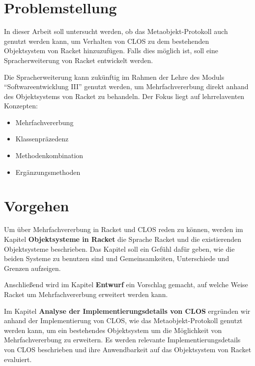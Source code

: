 \section{Problemstellung} 
In dieser Arbeit soll untersucht werden, ob das Metaobjekt-Protokoll auch genutzt werden kann, um Verhalten von CLOS zu dem bestehenden Objektsystem von Racket hinzuzufügen. Falls dies möglich ist, soll eine Spracherweiterung von Racket entwickelt werden. 

Die Spracherweiterung kann zukünftig im Rahmen der Lehre des Moduls ``Softwareentwicklung III'' genutzt werden, um Mehrfachvererbung direkt anhand des Objektsystems von Racket zu behandeln. Der Fokus liegt auf lehrrelaventen Konzepten: 
\begin{itemize}
 \item Mehrfachvererbung
 \item Klassenpräzedenz
 \item Methodenkombination
 \item Ergänzungsmethoden
\end{itemize}

% 


\section{Vorgehen}
Um über Mehrfachvererbung in Racket und CLOS reden zu können, werden im Kapitel \textbf{Objektsysteme in Racket} die Sprache Racket und die existierenden Objektsysteme beschrieben. Das Kapitel soll ein Gefühl dafür geben, wie die beiden Systeme zu benutzen sind und Gemeinsamkeiten, Unterschiede und Grenzen aufzeigen.

Anschließend wird im Kapitel \textbf{Entwurf} ein Vorschlag gemacht, auf welche Weise Racket um Mehrfachvererbung erweitert werden kann. 

Im Kapitel \textbf{Analyse der Implementierungsdetails von CLOS} ergründen wir anhand der Implementierung von CLOS, wie das Metaobjekt-Protokoll genutzt werden kann, um ein bestehendes Objektsystem um die Möglichkeit von Mehrfachvererbung zu erweitern. Es werden relevante Implementierungsdetails von CLOS beschrieben und ihre Anwendbarkeit auf das Objektsystem von Racket evaluiert.

